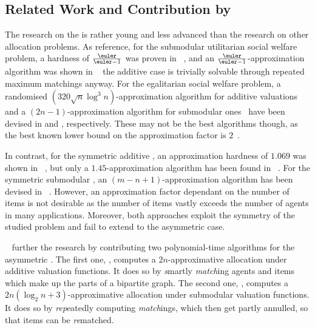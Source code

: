 \subsection[Related Work and Contribution]{Related Work and Contribution by \citeauthor{APNSWuSVþUM}}
\label{subsec:intro:contribution}

The research on the \NSW{} is rather young and less advanced than the research on other allocation problems.
As reference\footnotemark[1], for the submodular utilitarian social welfare problem, a hardness of \(\af\) was proven in \citeyear{inapprox_results_for_combi_auctions_with_submod_utility_funcs}~\cite{inapprox_results_for_combi_auctions_with_submod_utility_funcs}, and an \(\af\)-approximation algorithm was shown in \citeyear{opt_approx_for_the_submod_nsw_in_the_value_oracle_model}~\cite{opt_approx_for_the_submod_nsw_in_the_value_oracle_model} \Dash the additive case is trivially solvable through repeated maximum matchings anyway.
For the egalitarian social welfare problem, a randomised \((320 \sqrt{n} \log^3 n)\)-approximation algorithm for additive valuations~\cite{an_approx_algo_for_maxmin_fair_alloc_of_indiv_goods} and a \((2n-1)\)-approximation algorithm for submodular ones~\cite{approx_algo_for_the_maxmin_alloc_problem} have been devised in \citeyear{an_approx_algo_for_maxmin_fair_alloc_of_indiv_goods} and \citeyear{approx_algo_for_the_maxmin_alloc_problem}, respectively.
These may not be the best algorithms though, as the best known lower bound on the approximation factor is \(2\)~\cite{allocating_indiv_goods}.

In contrast, for the symmetric additive \NSW{}, an approximation hardness of \(1.069\) was shown in \citeyear{satiation_in_fisher_markets_and_approx_of_nsw}~\cite{satiation_in_fisher_markets_and_approx_of_nsw}, but only a \(1.45\)-approximation algorithm has been found in \citeyear{finding_fair_and_efficient_allocs}~\cite{finding_fair_and_efficient_allocs}.
For the symmetric submodular \NSW, an \((m - n + 1)\)-approximation algorithm has been devised in \citeyear{min_envy_and_max_avg_nsw_in_the_alloc_of_indiv_goods}~\cite{min_envy_and_max_avg_nsw_in_the_alloc_of_indiv_goods}.
However, an approximation factor dependant on the number of items is not desirable as the number of items vastly exceeds the number of agents in many applications.
Moreover, both approaches exploit the symmetry of the studied problem and fail to extend to the asymmetric case.

~\cite{APNSWuSVþUM} further the research by contributing two polynomial-time algorithms for the asymmetric \NSW.
The first one, \emph{\SMatch}, computes a \(2n\)-approximative allocation under additive valuation functions.
It does so by \textsl{s}martly \textsl{match}ing agents and items which make up the parts of a bipartite graph.
The second one, \emph{\RepReMatch}, computes a \(2n (\log_2 n + 3)\)-approximative allocation under submodular valuation functions.
It does so by \textsl{rep}eatedly computing \textsl{match}ings, which then get partly annulled, so that items can be \textsl{re}matched.


